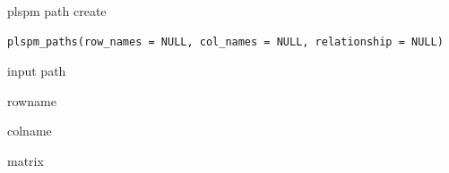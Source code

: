\documentclass[a4paper]{book}
\begin{document}
%
\begin{Description}
plspm path create
\end{Description}
%
\begin{Usage}
\begin{verbatim}
plspm_paths(row_names = NULL, col_names = NULL, relationship = NULL)
\end{verbatim}
\end{Usage}
%
\begin{Arguments}
\begin{ldescription}
\item[\code{relationship}] input path

\item[\code{rownames}] rowname

\item[\code{colnames}] colname
\end{ldescription}
\end{Arguments}
%
\begin{Value}
matrix
\end{Value}
%
\end{document}
